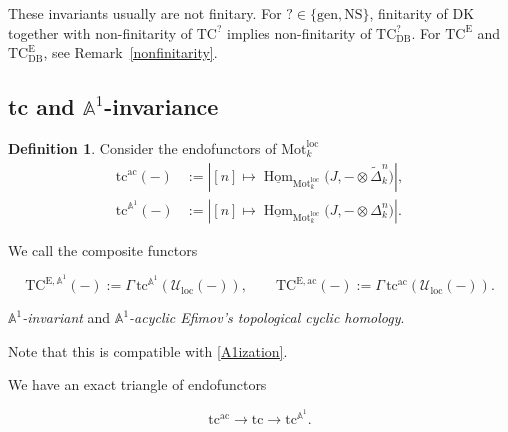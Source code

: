 \documentclass{amsart}
\theoremstyle{plain}
\theoremstyle{definition}
\newtheorem{defi}[prop]{Definition}
\newcommand{\bbA}{\mathbb{A}}
\newcommand{\Motloc}{\mathrm{Mot}^{\mathrm{loc}}}
\newcommand{\Uloc}{\mathcal U_{\mathrm{loc}}}
\newcommand{\TC}{\mathrm{TC}}
\newcommand{\DK}{\mathrm{DK}}
\newcommand{\tc}{\mathrm{tc}}
\DeclareMathOperator{\Hom}{Hom}
\newcommand{\DB}{\mathrm{DB}}
\newcommand{\NS}{\mathrm{NS}}
\newcommand{\gen}{\mathrm{gen}}
\begin{document}
These invariants usually are not finitary. For $?\in\{\gen, \NS\}$, finitarity of $\DK$ together with non-finitarity of $\TC^?$ implies non-finitarity of $\TC^?_{\DB}$. For $\TC^{\mathrm{E}}$ and $\TC^{\mathrm{E}}_{\DB}$, see Remark~\ref{nonfinitarity}.





\subsection{tc and $\bbA^1$-invariance}

\begin{defi}
Consider the endofunctors of $\Motloc_k$
\begin{align}
\tc^{\mathrm{ac}}(-)
&:=|[n]\longmapsto
\underline{\Hom}_{\Motloc_k}
\bigl(J,-\otimes\widetilde\Delta_k^n\bigr)|,
\label{eqtccycdef}\\
\tc^{\bbA^1}(-)
&:=|[n]\longmapsto
\underline{\Hom}_{\Motloc_k}
\bigl(J,-\otimes\Delta_k^n\bigr)|.
\label{eqtcA1def}
\end{align}

We call the composite functors

\[
\TC^{\mathrm{E}, \bbA^1}(-):=\Gamma\,\tc^{\bbA^1}(\Uloc(-)),
\qquad
\TC^{\mathrm{E}, \mathrm{ac}}(-):=\Gamma\,\tc^{\mathrm{ac}}(\Uloc(-)).
\]

\emph{$\bbA^1$-invariant} and \emph{$\bbA^1$-acyclic Efimov's topological cyclic homology}.

\end{defi}

Note that this is compatible with \ref{A1ization}.

We have an exact triangle of endofunctors

\begin{equation}\label{actcA1}
\tc^{\mathrm{ac}}\longrightarrow \tc\longrightarrow \tc^{\bbA^1}.
\end{equation}
\end{document}
